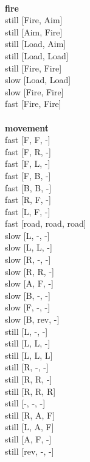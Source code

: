 \ \\ {\bf fire } \\
still [Fire, Aim] \\
still [Aim, Fire] \\
still [Load, Aim] \\
still [Load, Load] \\
still [Fire, Fire] \\
slow [Load, Load] \\
slow [Fire, Fire] \\
fast [Fire, Fire] \\
\ \\ {\bf movement } \\
fast [F, F, -] \\
fast [F, R, -] \\
fast [F, L, -] \\
fast [F, B, -] \\
fast [B, B, -] \\
fast [R, F, -] \\
fast [L, F, -] \\
fast [road, road, road] \\
slow [L, -, -] \\
slow [L, L, -] \\
slow [R, -, -] \\
slow [R, R, -] \\
slow [A, F, -] \\
slow [B, -, -] \\
slow [F, -, -] \\
slow [B, rev, -] \\
still [L, -, -] \\
still [L, L, -] \\
still [L, L, L] \\
still [R, -, -] \\
still [R, R, -] \\
still [R, R, R] \\
still [-, -, -] \\
still [R, A, F] \\
still [L, A, F] \\
still [A, F, -] \\
still [rev, -, -] \\


